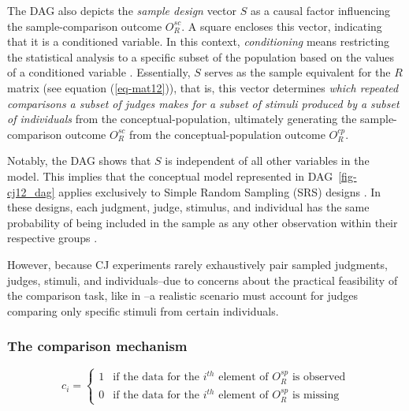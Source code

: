 \documentclass[
  authoryear,
  review,
  1p]{elsarticle}
\begin{document}
The DAG also depicts the \emph{sample design} vector \(S\) as a causal
factor influencing the sample-comparison outcome \(O^{sc}_{R}\). A
square encloses this vector, indicating that it is a conditioned
variable. In this context, \emph{conditioning} means restricting the
statistical analysis to a specific subset of the population based on the
values of a conditioned variable \citep[pp.~32]{Neal_2020}. Essentially,
\(S\) serves as the sample equivalent for the \(R\) matrix (see equation
(\ref{eq-mat12})), that is, this vector determines \emph{which repeated
comparisons a subset of judges makes for a subset of stimuli produced by
a subset of individuals} from the conceptual-population, ultimately
generating the sample-comparison outcome \(O^{sc}_{R}\) from the
conceptual-population outcome \(O^{cp}_{R}\).

Notably, the DAG shows that \(S\) is independent of all other variables
in the model. This implies that the conceptual model represented in
DAG~\ref{fig-cj12_dag} applies exclusively to Simple Random Sampling
(SRS) designs \citep[pp.~150]{Kohler_et_al_2019}. In these designs, each
judgment, judge, stimulus, and individual has the same probability of
being included in the sample as any other observation within their
respective groups \citep[pp.~16-112]{Lawson_2015}.

However, because CJ experiments rarely exhaustively pair sampled
judgments, judges, stimuli, and individuals--due to concerns about the
practical feasibility of the comparison task, like in
\citet[p.~5]{Boonen_et_al_2020}--a realistic scenario must account for
judges comparing only specific stimuli from certain individuals.

\subsubsection{The comparison
mechanism}\label{sec-theory-theoretical_SC2}

\[
c_i = \begin{cases} 
1 & \text{if the data for the } i^{th} \text{ element of } O^{sp}_{R} \text{ is observed} \\
0 & \text{if the data for the } i^{th} \text{ element of } O^{sp}_{R} \text{ is missing}
\end{cases}
\]
\end{document}
